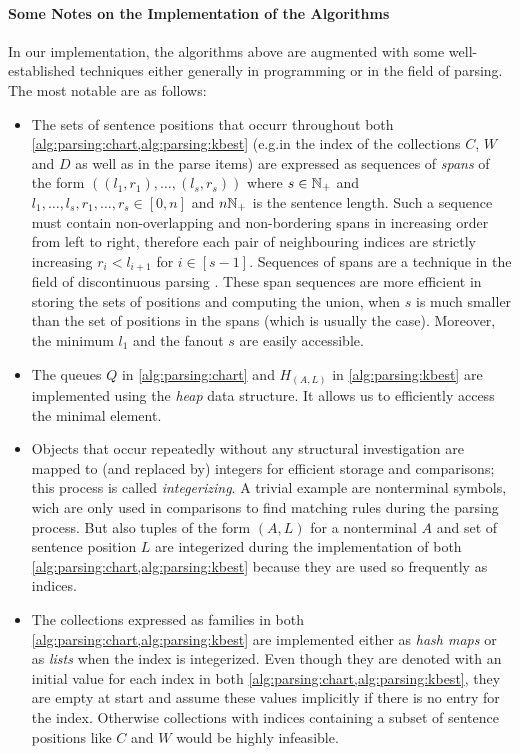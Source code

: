 \documentclass[../document.tex]{subfiles}
\begin{document}
    \paragraph{Some Notes on the Implementation of the Algorithms}
    In our implementation, the algorithms above are augmented with some well-established techniques either generally in programming or in the field of parsing.
    The most notable are as follows:
    \begin{itemize}
        \item The sets of sentence positions that occurr throughout both \cref{alg:parsing:chart,alg:parsing:kbest} (e.g.\@ in the index of the collections \(C\), \(W\) and \(D\) as well as in the parse items) are expressed as sequences of \emph{spans} of the form \(((l_1, r_1), \ldots, (l_s, r_s))\) where \(s \in \mathbb{N}_+\) and \(l_1,\ldots,l_s,r_1,\ldots,r_s \in [0,n]\) and \(n \mathbb{N}_+\) is the sentence length.
            Such a sequence must contain non-overlapping and non-bordering spans in increasing order from left to right, therefore each pair of neighbouring indices are strictly increasing \(r_i < l_{i+1}\) for \(i \in [s-1]\).
            Sequences of spans are a technique in the field of discontinuous parsing \citep[e.g.][cf.\@ range vector in def.\@ 6.6]{Kal10}.
            These span sequences are more efficient in storing the sets of positions and computing the union, when \(s\) is much smaller than the set of positions in the spans (which is usually the case).
            Moreover, the minimum \(l_1\) and the fanout \(s\) are easily accessible.
        \item The queues \(Q\) in \cref{alg:parsing:chart} and \(H_{(A,L)}\) in \cref{alg:parsing:kbest} are implemented using the \emph{heap} data structure.
            It allows us to efficiently access the minimal element.
        \item Objects that occur repeatedly without any structural investigation are mapped to (and replaced by) integers for efficient storage and comparisons; this process is called \emph{integerizing}.
            A trivial example are nonterminal symbols, wich are only used in comparisons to find matching rules during the parsing process.
            But also tuples of the form \((A, L)\) for a nonterminal \(A\) and set of sentence position \(L\) are integerized during the implementation of both \cref{alg:parsing:chart,alg:parsing:kbest} because they are used so frequently as indices.
        \item The collections expressed as families in both \cref{alg:parsing:chart,alg:parsing:kbest} are implemented either as \emph{hash maps} or as \emph{lists} when the index is integerized.
            Even though they are denoted with an initial value for each index in both \cref{alg:parsing:chart,alg:parsing:kbest}, they are empty at start and assume these values implicitly if there is no entry for the index.
            Otherwise collections with indices containing a subset of sentence positions like \(C\) and \(W\) would be highly infeasible.
    \end{itemize}
    
\end{document}
